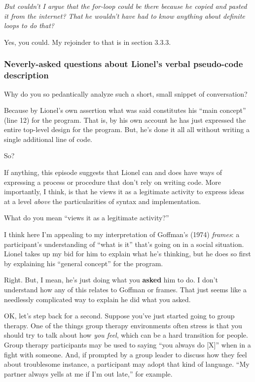 \emph{But couldn't I argue that the for-loop could be there because he
copied and pasted it from the internet? That he wouldn't have had to
know anything about definite loops to do that?}

Yes, you could. My rejoinder to that is in section 3.3.3.

\subsubsection{Neverly-asked questions about Lionel's verbal pseudo-code
description}\label{neverly-asked-questions-about-lionels-verbal-pseudo-code-description}

Why do you so pedantically analyze such a short, small snippet of
conversation?

Because by Lionel's own assertion what was said constitutes his ``main
concept'' (line 12) for the program. That is, by his own account he has
just expressed the entire top-level design for the program. But, he's
done it all all without writing a single additional line of code.

So?

If anything, this episode suggests that Lionel can and does have ways of
expressing a process or procedure that don't rely on writing code. More
importantly, I think, is that he views it as a legitimate activity to
express ideas at a level \emph{above} the particularities of syntax and
implementation.

What do you mean ``views it as a legitimate activity?''

I think here I'm appealing to my interpretation of Goffman's (1974)
\emph{frames}: a participant's understanding of ``what is it'' that's
going on in a social situation. Lionel takes up my bid for him to
explain what he's thinking, but he does so first by explaining his
``general concept'' for the program.

Right. But, I mean, he's just doing what you \textbf{asked} him to do. I
don't understand how any of this relates to Goffman or frames. That just
seems like a needlessly complicated way to explain he did what you
asked.

OK, let's step back for a second. Suppose you've just started going to
group therapy. One of the things group therapy environments often stress
is that you should try to talk about how \emph{you feel}, which can be a
hard transition for people. Group therapy participants may be used to
saying ``you always do {[}X{]}'' when in a fight with someone. And, if
prompted by a group leader to discuss how they feel about troublesome
instance, a participant may adopt that kind of language. ``My partner
always yells at me if I'm out late,'' for example.

